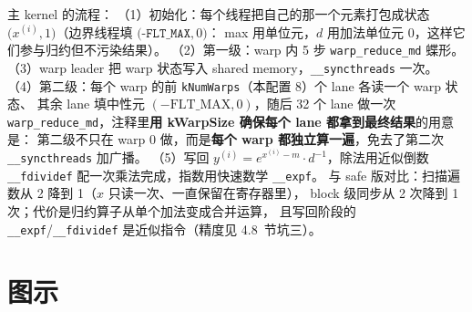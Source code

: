 

主 kernel 的流程：
（1）初始化：每个线程把自己的那一个元素打包成状态
$\bigl(x^{(i)}, 1\bigr)$（边界线程填 $\bigl(\texttt{-FLT\_MAX}, 0\bigr)$：
max 用单位元，$d$ 用加法单位元 0，这样它们参与归约但不污染结果）。
（2）第一级：warp 内 5 步 \texttt{warp\_\allowbreak{}reduce\_\allowbreak{}md} 蝶形。
（3）warp leader 把 warp 状态写入 shared memory，\texttt{\_\allowbreak{}\_\allowbreak{}syncthreads} 一次。
（4）第二级：每个 warp 的前 \texttt{kNumWarps}（本配置 8）个 lane 各读一个 warp 状态、
其余 lane 填中性元 $(-\mathrm{FLT\_MAX}, 0)$，随后 32 个 lane 做一次
\texttt{warp\_\allowbreak{}reduce\_\allowbreak{}md}，注释里\textbf{用 kWarpSize 确保每个 lane 都拿到最终结果}的用意是：
第二级不只在 warp 0 做，而是\textbf{每个 warp 都独立算一遍}，免去了第二次
\texttt{\_\allowbreak{}\_\allowbreak{}syncthreads} 加广播。
（5）写回 $y^{(i)} = e^{x^{(i)} - m} \cdot d^{-1}$，除法用近似倒数
\texttt{\_\_fdividef} 配一次乘法完成，指数用快速数学 \texttt{\_\_expf}。
与 safe 版对比：扫描遍数从 2 降到 1（$x$ 只读一次、一直保留在寄存器里），
block 级同步从 2 次降到 1 次；代价是归约算子从单个加法变成合并运算，
且写回阶段的 \texttt{\_\_expf}/\texttt{\_\_fdividef} 是近似指令（精度见 4.8~节坑三）。

\needspace{93mm}

\section{图示}

